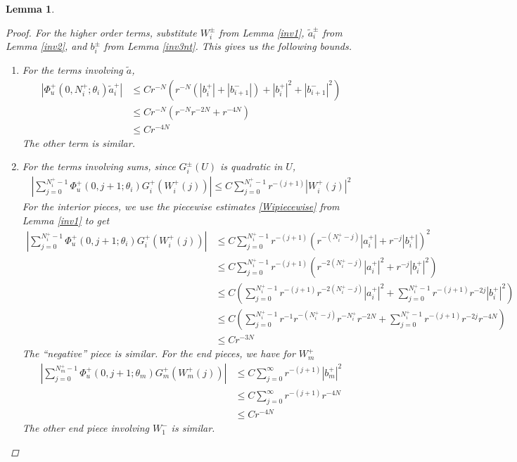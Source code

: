 \documentclass[12pt]{article}
\newtheorem{lemma}{Lemma}
\begin{document}
\begin{lemma}
\begin{proof}
For the higher order terms, substitute $W_i^\pm$ from Lemma \ref{inv1}, $\tilde{a}_i^\pm$ from Lemma \ref{inv2}, and $b_i^\pm$ from Lemma \ref{inv3nt}. This gives us the following bounds.
\begin{enumerate}
	\item For the terms involving $\tilde{a}$, 
	\begin{align*}
	|\Phi_u^+(0, N_i^+; \theta_i) \tilde{a}_i^+| 
	&\leq C r^{-N} (r^{-N}(|b_i^+|+|b_{i+1}^-|) + |b_i^+|^2+|b_{i+1}^-|^2) \\
	&\leq C r^{-N} (r^{-N}r^{-2N} + r^{-4N}) \\
	&\leq C r^{-4N}
	\end{align*}
	The other term is similar.
	\item For the terms involving sums, since $G_i^\pm(U)$ is quadratic in $U$,
	\begin{align*}
	\left| \sum_{j = 0}^{N_i^+-1} \Phi_u^+(0, j+1; \theta_i) G_i^+(W_i^+(j)) \right|
	\leq C \sum_{j = 0}^{N_i^+-1} r^{-(j+1)}|W_i^+(j)|^2
	\end{align*}
	For the interior pieces, we use the piecewise estimates \eqref{Wipiecewise} from Lemma \ref{inv1} to get
	\begin{align*}
	\left| \sum_{j = 0}^{N_i^+-1} \Phi_u^+(0, j+1; \theta_i) G_i^+(W_i^+(j)) \right|
	&\leq C \sum_{j = 0}^{N_i^+-1} r^{-(j+1)}(r^{-(N_i^+ - j)}|a_i^+| + r^{-j}|b_i^+| )^2 \\
	&\leq C \sum_{j = 0}^{N_i^+-1} r^{-(j+1)}(r^{-2(N_i^+ - j)}|a_i^+|^2 + r^{-j}|b_i^+|^2) \\
	&\leq C \left( \sum_{j = 0}^{N_i^+-1} r^{-(j+1)}r^{-2(N_i^+ - j)}|a_i^+|^2 + \sum_{j = 0}^{N_i^+-1} r^{-(j+1)} r^{-2j}|b_i^+|^2 \right) \\
	&\leq C \left( \sum_{j = 0}^{N_i^+-1} r^{-1}r^{-(N_i^+ - j)}r^{-N_i^+}r^{-2N} + \sum_{j = 0}^{N_i^+-1} r^{-(j+1)} r^{-2j}r^{-4N} \right) \\
	&\leq C r^{-3N}
	\end{align*}
	The ``negative'' piece is similar. For the end pieces, we have for $W_m^+$
	\begin{align*}
	\left| \sum_{j = 0}^{N_m^+-1} \Phi_u^+(0, j+1; \theta_m) G_m^+(W_m^+(j)) \right|
	&\leq C \sum_{j = 0}^\infty r^{-(j+1)}|b_m^+|^2 \\
	&\leq C \sum_{j = 0}^\infty r^{-(j+1)}r^{-4N} \\
	&\leq C r^{-4N}
	\end{align*}
	The other end piece involving $W_1^-$ is similar.
\end{enumerate}

\end{proof}
\end{lemma}
\end{document}
